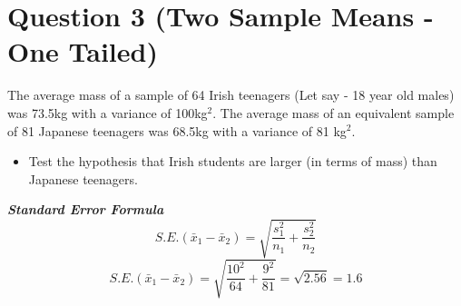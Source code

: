\documentclass[a4paper,12pt]{article}
\begin{document}
\section*{Question 3 (Two Sample Means - One Tailed)}
The average mass of a sample of 64 Irish teenagers (Let say - 18 year old males) was 73.5kg with a variance of 100kg$^2$. 
The average mass of an equivalent sample of 81 Japanese teenagers was 68.5kg with a variance of 81 kg$^2$. 
\begin{itemize}
\item  Test the hypothesis that Irish students are larger (in terms of mass) than Japanese teenagers.
\end{itemize}

\textbf{\textit{Standard Error Formula}}
\[ S.E.(\bar{x}_1 - \bar{x}_2)  = \sqrt{\frac{s_1^2}{n_1} + \frac{s_2^2}{n_2}} \]
\[ S.E.(\bar{x}_1 - \bar{x}_2)  = \sqrt{\frac{10^2}{64} + \frac{9^2}{81}}  = \sqrt{2.56} = 1.6\]
\newpage
\end{document}
